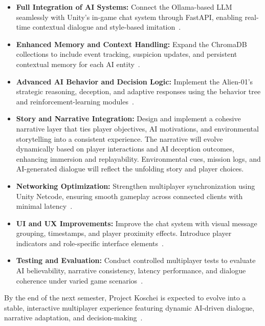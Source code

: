\begin{itemize}
    \item \textbf{Full Integration of AI Systems:}  
    Connect the Ollama-based LLM seamlessly with Unity's in-game chat system through FastAPI, enabling real-time contextual dialogue and style-based imitation~\cite{park2023generative,kolenbrander2023}.
    
    \item \textbf{Enhanced Memory and Context Handling:}  
    Expand the ChromaDB collections to include event tracking, suspicion updates, and persistent contextual memory for each AI entity~\cite{liu2022,wangw2024,hong2025}.
    
    \item \textbf{Advanced AI Behavior and Decision Logic:}  
    Implement the Alien-01's strategic reasoning, deception, and adaptive responses using the behavior tree and reinforcement-learning modules~\cite{hagendorff2023,park2023ai,poje2023}.
    
    \item \textbf{Story and Narrative Integration:}  
    Design and implement a cohesive narrative layer that ties player objectives, AI motivations, and environmental storytelling into a consistent experience. The narrative will evolve dynamically based on player interactions and AI deception outcomes, enhancing immersion and replayability. Environmental cues, mission logs, and AI-generated dialogue will reflect the unfolding story and player choices.
    
    \item \textbf{Networking Optimization:}  
    Strengthen multiplayer synchronization using Unity Netcode, ensuring smooth gameplay across connected clients with minimal latency~\cite{barri2016,deng2018,motoo2021}.
    
    \item \textbf{UI and UX Improvements:}  
    Improve the chat system with visual message grouping, timestamps, and player proximity effects. Introduce player indicators and role-specific interface elements~\cite{raith2021}.
    
    \item \textbf{Testing and Evaluation:}  
    Conduct controlled multiplayer tests to evaluate AI believability, narrative consistency, latency performance, and dialogue coherence under varied game scenarios~\cite{yoo2023,danry2023}.
\end{itemize}

By the end of the next semester, Project Koschei is expected to evolve into a stable, interactive multiplayer experience featuring dynamic AI-driven dialogue, narrative adaptation, and decision-making~\cite{zeng2023,mikros2023}.

